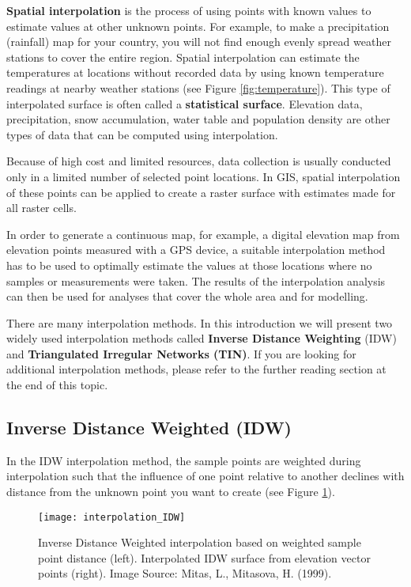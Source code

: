 \textbf{Spatial interpolation} is the process of using points with known values to
estimate values at other unknown points. For example, to make a precipitation
(rainfall) map for your country, you will not find enough evenly spread
weather stations to cover the entire region. Spatial interpolation can
estimate the temperatures at locations without recorded data by using known
temperature readings at nearby weather stations (see Figure
\ref{fig:temperature}). This type of interpolated surface is often called a
\textbf{statistical surface}.
Elevation data, precipitation, snow accumulation, water table and population
density are other types of data that can be computed using interpolation.

Because of high cost and limited resources, data collection is usually
conducted only in a limited number of selected point locations. In GIS,
spatial interpolation of these points can be applied to create a raster
surface with estimates made for all raster cells. 

In order to generate a continuous map, for example, a digital elevation map
from elevation points measured with a GPS device, a suitable interpolation
method has to be used to optimally estimate the values at those locations
where no samples or measurements were taken. The results of the interpolation
analysis can then be used for analyses that cover the whole area and for
modelling. 

There are many interpolation methods. In this introduction we will present
two widely used interpolation methods called \textbf{Inverse Distance
Weighting} (IDW) and \textbf{Triangulated Irregular Networks (TIN)}. If you
are looking for additional
interpolation methods, please refer to the further reading section at the end
of this topic. 

\subsection{Inverse Distance Weighted (IDW)}

In the IDW interpolation method, the sample points are weighted during
interpolation such that the influence of one point relative to another
declines with distance from the unknown point you want to create (see
Figure \ref{fig:idw}). 

\begin{figure}[ht]
   \begin{center}
   \caption{Inverse Distance Weighted interpolation based on weighted sample
point distance (left). Interpolated IDW surface from elevation vector points
(right). Image Source: Mitas, L., Mitasova, H. (1999).}
\label{fig:idw}\smallskip
   \texttt{[image: interpolation\_IDW]}
\end{center}
\end{figure}

